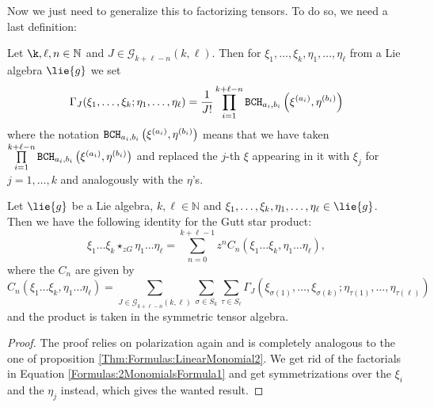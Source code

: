 Now we just need to generalize this to factorizing tensors. To do so, we 
need a last definition:
\begin{definition}
	\label{Def:GuttInsert}
	Let $\k, \ell, n \in \mathbb{N}$ and $J \in \mathcal{G}_{k + \ell - 
	n}(k, \ell)$. Then for $\xi_1, \ldots, \xi_k, \eta_1, \ldots, 
	\eta_{\ell}$ from a Lie algebra $\lie{g}$ we set
	\begin{equation}
		\label{Formulas:GuttInsert}
		\Gamma_J(\xi_1, \ldots, \xi_k; \eta_1, \ldots, \eta_{\ell})
		=
		\frac{1}{J!}
		\prod\limits_{i=1}^{k + \ell - n}
		\mathtt{BCH}_{a_i, b_i}\left(\xi^{(a_i)}, \eta^{(b_i)}\right)
	\end{equation}
	where the notation $\mathtt{BCH}_{a_i, b_i}\left(\xi^{(a_i)}, \eta^{(b_i)}\right)$ 
	means that we have taken $\prod\limits_{i=1}^{k + \ell - n} 
	\mathtt{BCH}_{a_i, b_i}\left(\xi^{(a_i)}, \eta^{(b_i)}\right)$ and replaced the 
	$j$-th $\xi$ appearing in it with $\xi_j$ for $j = 1, \ldots, k$ and 
	analogously with the $\eta$'s.
\end{definition}
\begin{proposition}
	\label{proposition:2MonomialsFormula2}
	Let $\lie{g}$ be a Lie algebra, $k, \ell \in \mathbb{N}$ and $\xi_1, 
	\ldots, \xi_k, \eta_1, \ldots, \eta_{\ell} \in \lie{g}$. Then we 
	have the following identity for the Gutt star product:
	\begin{equation*}
    	\xi_1 \ldots \xi_k \star_{zG} \eta_1 \ldots \eta_{\ell}
    	=
	    \sum\limits_{n=0}^{k + \ell -1}
    	z^n C_n
    	\left( 
    		\xi_1 \ldots \xi_k, \eta_1 \ldots \eta_{\ell}
    	\right),
	\end{equation*}
	where the $C_n$ are given by
	\begin{equation}
		\label{Formulas:2MonomialsFormula2}
        C_n
        \left( 
    		\xi_1 \ldots \xi_k, \eta_1 \ldots \eta_{\ell}
    	\right)
        =
        \sum\limits_{J \in \mathcal{G}_{k + \ell - n}(k, \ell)}
        \sum\limits_{\sigma \in S_k}
        \sum\limits_{\tau \in S_{\ell}}
        \Gamma_J 
        \left(
        	\xi_{\sigma(1)}, \ldots, \xi_{\sigma(k)};
        	\eta_{\tau(1)}, \ldots, \eta_{\tau(\ell)}
        \right)
	\end{equation}
	and the product is taken in the symmetric tensor algebra.
\end{proposition}
\begin{proof}
	The proof relies on polarization again and is completely analogous 
	to the one of proposition \ref{Thm:Formulas:LinearMonomial2}. We get 
	rid of the factorials in Equation 
	\eqref{Formulas:2MonomialsFormula1} and get symmetrizations over the 
	$\xi_i$ and the $\eta_j$ instead, which gives the wanted result.
\end{proof}
